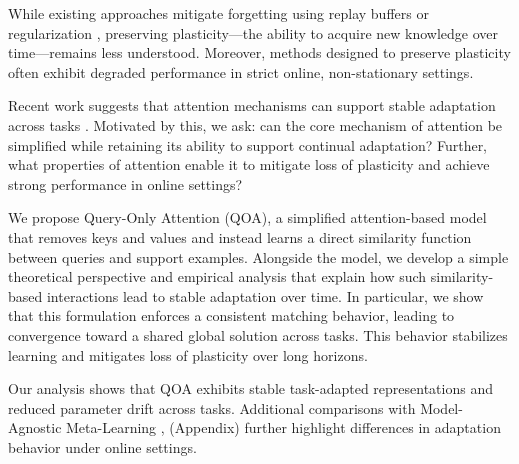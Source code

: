 \documentclass{article}
\begin{document}
While existing approaches mitigate forgetting using replay buffers \citep{zhang2024core} or regularization \citep{kirkpatrick2017overcoming}, preserving plasticity—the ability to acquire new knowledge over time—remains less understood. Moreover, methods designed to preserve plasticity often exhibit degraded performance in strict online, non-stationary settings.

Recent work suggests that attention mechanisms \citep{vaswani2017attention, olsson2022induction, graves2014ntm} can support stable adaptation across tasks \citep{wang2025replay}. Motivated by this, we ask: can the core mechanism of attention be simplified while retaining its ability to support continual adaptation? Further, what properties of attention enable it to mitigate loss of plasticity and achieve strong performance in online settings?

We propose Query-Only Attention (QOA), a simplified attention-based model that removes keys and values and instead learns a direct similarity function between queries and support examples. Alongside the model, we develop a simple theoretical perspective and empirical analysis that explain how such similarity-based interactions lead to stable adaptation over time. In particular, we show that this formulation enforces a consistent matching behavior, leading to convergence toward a shared global solution across tasks. This behavior stabilizes learning and mitigates loss of plasticity over long horizons.

Our analysis shows that QOA exhibits stable task-adapted representations and reduced parameter drift across tasks. Additional comparisons with Model-Agnostic Meta-Learning \citep{finn2017maml}, (Appendix) further highlight differences in adaptation behavior under online settings.
\end{document}

